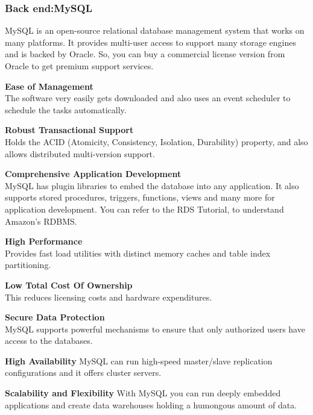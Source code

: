 \documentclass[a4paper, 12pt]{report}
\begin{document}
\subsubsection{Back end:MySQL}
MySQL is an open-source relational database management system that works on many platforms. It provides multi-user access to support many storage engines and is backed by Oracle. So, you can buy a commercial license version from Oracle to get premium support services.
\begin{description}[font=$\bullet$]
\item
\textbf{Ease of Management}
\\The software very easily gets downloaded and also uses an event scheduler to schedule the tasks automatically.
\item
\textbf{Robust Transactional Support}
\\
Holds the ACID (Atomicity, Consistency, Isolation, Durability) property, and also allows distributed multi-version support. 
\item
\textbf{Comprehensive Application Development}\\ MySQL has plugin libraries to embed the database into any application. It also supports stored procedures, triggers, functions, views and many more for application development. You can refer to the RDS Tutorial, to understand Amazon’s RDBMS. 
\item
\textbf{
High Performance }\\Provides fast load utilities with distinct memory caches and table index partitioning.
\item
\textbf
{Low Total Cost Of Ownership}\\ This reduces licensing costs and hardware expenditures.
\item
\textbf{Secure Data Protection}\\ MySQL supports powerful mechanisms to ensure that only authorized users have access to the databases.
\item
\textbf{High Availability} MySQL can run high-speed master/slave replication configurations and it offers cluster servers.
\item
\textbf{Scalability and Flexibility } With MySQL you can run deeply embedded applications and create data warehouses holding a humongous amount of data.
\end{description}
\end{document}

